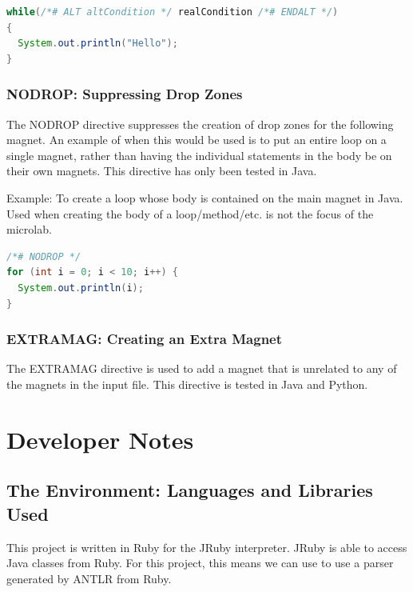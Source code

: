 \documentclass[letter,10pt]{article}
\begin{document}
\begin{lstlisting}[language=Java]
while(/*# ALT altCondition */ realCondition /*# ENDALT */) 
{
  System.out.println("Hello");
}
\end{lstlisting}


\subsubsection{NODROP: Suppressing Drop Zones}

The NODROP directive suppresses the creation of drop zones for the 
following magnet. An example of when this would be used is to put an 
entire loop on a single magnet, rather than having the individual 
statements in the body be on their own magnets. This directive has only 
been tested in Java. 

Example: To create a loop whose body is contained on the main magnet in 
Java. Used when creating the body of a loop/method/etc. is not the 
focus of the microlab.

\begin{lstlisting}[language=Java]
/*# NODROP */
for (int i = 0; i < 10; i++) {
  System.out.println(i);
}
\end{lstlisting}

\subsubsection{EXTRAMAG: Creating an Extra Magnet}

The EXTRAMAG directive is used to add a magnet that is unrelated to any 
of the magnets in the input file. This directive is tested in Java and 
Python.  



\section{Developer Notes}

\subsection{The Environment: Languages and Libraries Used}


This project is written in Ruby for the JRuby interpreter. JRuby is able
to access Java classes from Ruby. For this project, this means we can 
use to use a parser generated by ANTLR from Ruby.
\end{document}
